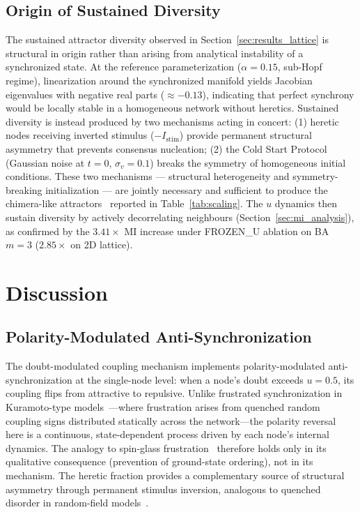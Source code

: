 ﻿\documentclass[11pt]{article}
\begin{document}
\subsection{Origin of Sustained Diversity}

The sustained attractor diversity observed in Section~\ref{sec:results_lattice} is structural in origin rather than arising from analytical instability of a synchronized state. At the reference parameterization ($\alpha = 0.15$, sub-Hopf regime), linearization around the synchronized manifold yields Jacobian eigenvalues with negative real parts ($\approx -0.13$), indicating that perfect synchrony would be locally stable in a homogeneous network without heretics. Sustained diversity is instead produced by two mechanisms acting in concert: (1) heretic nodes receiving inverted stimulus ($-I_{\text{stim}}$) provide permanent structural asymmetry that prevents consensus nucleation; (2) the Cold Start Protocol (Gaussian noise at $t=0$, $\sigma_v = 0.1$) breaks the symmetry of homogeneous initial conditions. These two mechanisms — structural heterogeneity and symmetry-breaking initialization — are jointly necessary and sufficient to produce the chimera-like attractors~\cite{abrams2004} reported in Table~\ref{tab:scaling}. The $u$ dynamics then sustain diversity by actively decorrelating neighbours (Section~\ref{sec:mi_analysis}), as confirmed by the $3.41\times$ MI increase under FROZEN\_U ablation on BA $m=3$ ($2.85\times$ on 2D lattice).

\section{Discussion}
\label{sec:discussion}

\subsection{Polarity-Modulated Anti-Synchronization}

The doubt-modulated coupling mechanism implements polarity-modulated anti-synchronization at the single-node level: when a node's doubt exceeds $u = 0.5$, its coupling flips from attractive to repulsive. Unlike frustrated synchronization in Kuramoto-type models~\cite{odor2024}---where frustration arises from quenched random coupling signs distributed statically across the network---the polarity reversal here is a continuous, state-dependent process driven by each node's internal dynamics. The analogy to spin-glass frustration~\cite{toulouse1977} therefore holds only in its qualitative consequence (prevention of ground-state ordering), not in its mechanism. The heretic fraction provides a complementary source of structural asymmetry through permanent stimulus inversion, analogous to quenched disorder in random-field models~\cite{nattermann1998}.
\end{document}
